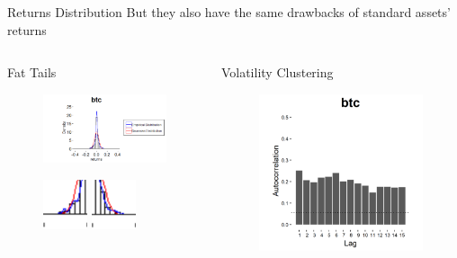 \documentclass[aspectratio=169]{beamer}
\begin{document}
\begin{frame}{Returns Distribution}
But they also have the same drawbacks of standard assets' returns
	\begin{columns}
		\begin{column}{0.5\textwidth}
		\centering
		\bigskip
		
		Fat Tails
		\begin{figure}
			\includegraphics[width=4.5cm]{Images/distrbtc.png}
		\end{figure}
		\begin{figure}
			\includegraphics[width=1.3cm]{Images/codasinistra}
			\includegraphics[width=1.3cm]{Images/codadestra}
		\end{figure}
		\end{column}
		\begin{column}{0.5\textwidth}  
		\centering
		Volatility Clustering
		\begin{figure}
			\includegraphics[width=6cm, height=4.6cm]{Images/clust}
		\end{figure}
		\end{column}
	\end{columns}
\end{frame}
\end{document}
